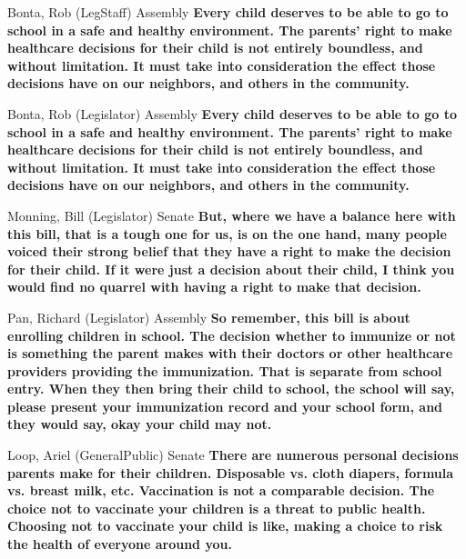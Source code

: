 \begin{result}{22.431415639841582}{Bonta, Rob (LegStaff) Assembly}
\textbf{Every child deserves to be able to go to school in a safe and healthy environment. The parents' right to make healthcare decisions for their child is not entirely boundless, and without limitation. It must take into consideration the effect those decisions have on our neighbors, and others in the community.
}\end{result}

\begin{result}{22.431415639841582}{Bonta, Rob (Legislator) Assembly}
\textbf{Every child deserves to be able to go to school in a safe and healthy environment. The parents' right to make healthcare decisions for their child is not entirely boundless, and without limitation. It must take into consideration the effect those decisions have on our neighbors, and others in the community.
}\end{result}

\begin{result}{20.616309653426804}{Monning, Bill (Legislator) Senate}
\textbf{But, where we have a balance here with this bill, that is a tough one for us, is on the one hand, many people voiced their strong belief that they have a right to make the decision for their child. If it were just a decision about their child, I think you would find no quarrel with having a right to make that decision.
}\end{result}

\begin{result}{15.940706597810152}{Pan, Richard (Legislator) Assembly}
\textbf{So remember, this bill is about enrolling children in school. The decision whether to immunize or not is something the parent makes with their doctors or other healthcare providers providing the immunization. That is separate from school entry. When they then bring their child to school, the school will say, please present your immunization record and your school form, and they would say, okay your child may not.
}\end{result}

\begin{result}{15.605225435122286}{Loop, Ariel (GeneralPublic) Senate}
\textbf{There are numerous personal decisions parents make for their children. Disposable vs. cloth diapers, formula vs. breast milk, etc. Vaccination is not a comparable decision. The choice not to vaccinate your children is a threat to public health. Choosing not to vaccinate your child is like, making a choice to risk the health of everyone around you.
}\end{result}

